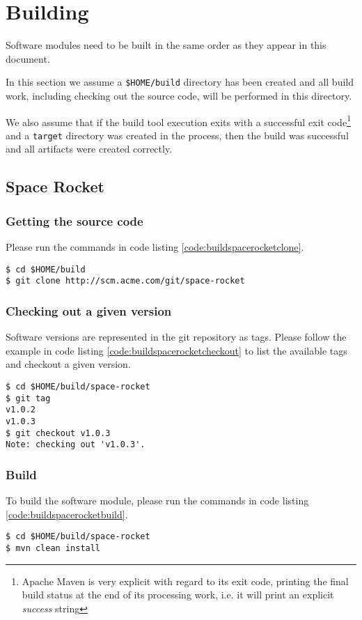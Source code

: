 \section{Building}

Software modules need to be built in the same order as they appear in
this document.

In this section we assume a \texttt{\$HOME/build} directory has been
created and all build work, including checking out the source code, will
be performed in this directory.

We also assume that if the build tool execution exits with a successful
exit code\footnote{Apache Maven is very explicit with regard to its exit
code, printing the final build status at the end of its processing work,
i.e. it will print an explicit \textit{success} string} and a
\texttt{target} directory was created in the process, then the build was
successful and all artifacts were created correctly. 

\subsection{Space Rocket}
\subsubsection{Getting the source code}

Please run the commands in code listing \ref{code:buildspacerocketclone}.

\begin{lstlisting}[label=code:buildspacerocketclone,caption=Cloning the
\texttt{space-rocket} module]
$ cd $HOME/build
$ git clone http://scm.acme.com/git/space-rocket
\end{lstlisting}

\subsubsection{Checking out a given version}

Software versions are represented in the git repository as tags. Please
follow the example in code listing \ref{code:buildspacerocketcheckout}
to list the available tags and checkout a given version.

\begin{lstlisting}[label=code:buildspacerocketcheckout,caption=Listing
version tags and checking out one in the \texttt{space-rocket} module]
$ cd $HOME/build/space-rocket
$ git tag
v1.0.2
v1.0.3
$ git checkout v1.0.3
Note: checking out 'v1.0.3'.
\end{lstlisting}

\subsubsection{Build}
\label{sec:buildspacerocketbuild}

To build the software module, please run the commands in code listing
\ref{code:buildspacerocketbuild}.

\begin{lstlisting}[label=code:buildspacerocketbuild,caption=Building the
\texttt{space-rocket} software module]
$ cd $HOME/build/space-rocket
$ mvn clean install
\end{lstlisting}
